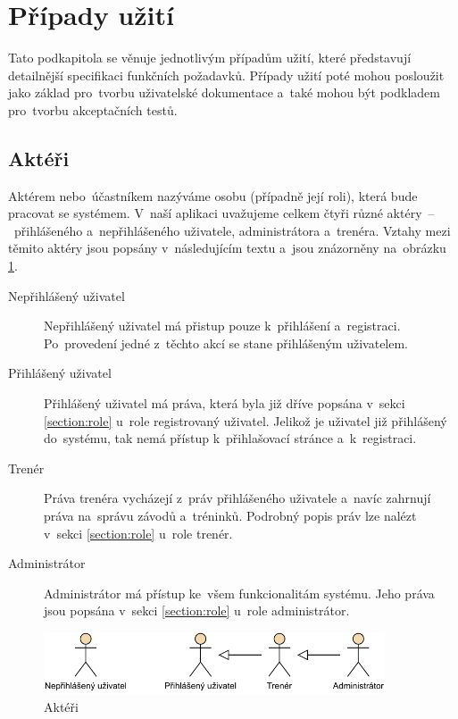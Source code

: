 \section{Případy užití}
Tato podkapitola se věnuje jednotlivým případům užití, které představují detailnější specifikaci funkčních požadavků. Případy užití poté mohou posloužit jako základ pro~tvorbu uživatelské dokumentace a~také mohou být podkladem pro~tvorbu akceptačních testů. \cite{usecases}

\subsection{Aktéři}
Aktérem nebo~účastníkem nazýváme osobu (případně její roli), která bude pracovat se systémem. V~naší aplikaci uvažujeme celkem čtyři různé aktéry~–~přihlášeného a~nepřihlášeného uživatele, administrátora a~trenéra. Vztahy mezi těmito aktéry jsou popsány v~následujícím textu a~jsou znázorněny na~obrázku \ref{figure:actors}.
\begin{description}
	\item[Nepřihlášený uživatel]\hfill\newline
	Nepřihlášený uživatel má přistup pouze k~přihlášení a~registraci. Po~provedení jedné z~těchto akcí se stane přihlášeným uživatelem.
	\item[Přihlášený uživatel]\hfill\newline
	Přihlášený uživatel má práva, která byla již dříve popsána v~sekci \ref{section:role} u~role registrovaný uživatel. Jelikož je uživatel již přihlášený do~systému, tak nemá přístup k~přihlašovací stránce a~k~registraci.
	\item[Trenér]\hfill\newline
	Práva trenéra vycházejí z~práv přihlášeného uživatele a~navíc zahrnují práva na~správu závodů a~tréninků. Podrobný popis práv lze nalézt v~sekci \ref{section:role} u~role trenér.
	\item[Administrátor]\hfill\newline
	Administrátor má přístup ke~všem funkcionalitám systému. Jeho práva jsou popsána v~sekci \ref{section:role} u~role administrátor.
\end{description}

\begin{figure}[h]
	\caption{Aktéři}
	\label{figure:actors}
	\centering
	\includegraphics[width=0.9\textwidth]{images/actors}
\end{figure}

